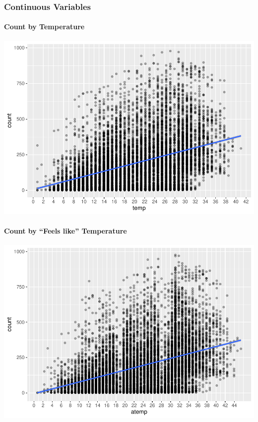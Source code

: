 \documentclass[american,]{article}
\let\oldparagraph\paragraph
\renewcommand{\paragraph}[1]{\oldparagraph{#1}\mbox{}}
\begin{document}
\newpage

\hypertarget{continuous-variables}{%
\subsubsection{Continuous Variables}\label{continuous-variables}}

\hypertarget{count-by-temperature}{%
\paragraph{Count by Temperature}\label{count-by-temperature}}

\includegraphics{BikeSharingDemand_files/figure-latex/train.mod.1.temp-1.pdf}

\newpage

\hypertarget{count-by-feels-like-temperature}{%
\paragraph{Count by ``Feels like'' Temperature}\label{count-by-feels-like-temperature}}

\includegraphics{BikeSharingDemand_files/figure-latex/train.mod.1.atemp-1.pdf}
\end{document}

